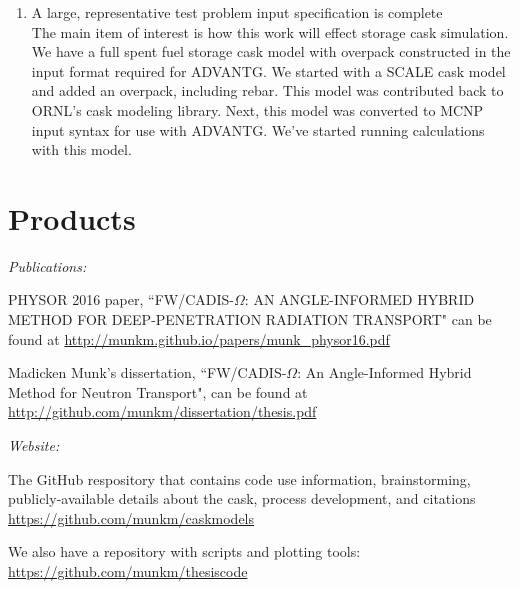 \documentclass[12pt]{article}
\begin{document}
\begin{enumerate}
\item A large, representative test problem input specification is complete\\
The main item of interest is how this work will effect storage cask simulation. 
We have a full spent fuel storage cask model with overpack constructed in the input format required for ADVANTG. 
We started with a SCALE cask model and added an overpack, including rebar. 
This model was contributed back to ORNL's cask modeling library. 
Next, this model was converted to MCNP input syntax for use with ADVANTG.
We've started running calculations with this model.
\end{enumerate}



\section{Products}
\label{sect::products}
\textit{Publications:} 
\begin{compactitem}
\item PHYSOR 2016 paper, ``FW/CADIS-$\Omega$: AN ANGLE-INFORMED HYBRID METHOD FOR DEEP-PENETRATION RADIATION TRANSPORT" can be found at \url{http://munkm.github.io/papers/munk\_physor16.pdf}

\item Madicken Munk's dissertation, ``FW/CADIS-$\Omega$: An Angle-Informed Hybrid Method for Neutron Transport", can be found at \url{http://github.com/munkm/dissertation/thesis.pdf}
\end{compactitem}

\textit{Website:} 
\begin{compactitem}
\item The GitHub respository that contains code use information, brainstorming, publicly-available details about the cask, process development, and citations \url{https://github.com/munkm/caskmodels}

\item We also have a repository with scripts and plotting tools: \url{https://github.com/munkm/thesiscode}
\end{compactitem}
\end{document}
